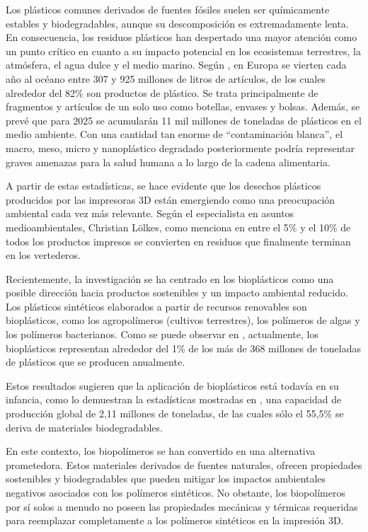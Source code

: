 \documentclass[14pt,oneside]{extarticle} %
\begin{document}
Los plásticos comunes derivados de fuentes fósiles suelen ser químicamente estables y biodegradables, aunque su descomposición es extremadamente lenta. En consecuencia, los residuos plásticos han despertado una mayor atención como un punto crítico en cuanto a su impacto potencial en los ecosistemas terrestres, la atmósfera, el agua dulce y el medio marino. Según \cite{dang2022}, en Europa se vierten cada año al océano entre 307 y 925 millones de litros de artículos, de los cuales alrededor del 82\% son productos de plástico. Se trata principalmente de fragmentos y artículos de un solo uso como botellas, envases y bolsas. Además, se prevé que para 2025 se acumularán 11 mil millones de toneladas de plásticos en el medio ambiente. Con una cantidad tan enorme de “contaminación blanca”, el macro, meso, micro y nanoplástico degradado posteriormente podría representar graves amenazas para la salud humana a lo largo de la cadena alimentaria.

A partir de estas estadísticas, se hace evidente que los desechos plásticos producidos por las impresoras 3D están emergiendo como una preocupación ambiental cada vez más relevante. Según el especialista en asuntos medioambientales, Christian Lölkes, como menciona en \cite{nationalgeographic} entre el 5\% y el 10\% de todos los productos impresos se convierten en residuos que finalmente terminan en los vertederos.

Recientemente, la investigación se ha centrado en los bioplásticos como una posible dirección hacia productos sostenibles y un impacto ambiental reducido. Los plásticos sintéticos elaborados a partir de recursos renovables son bioplásticos, como los agropolímeros (cultivos terrestres), los polímeros de algas y los polímeros bacterianos. Como se puede observar en \cite{rajpoot2022}, actualmente, los bioplásticos representan alrededor del 1\% de los más de 368 millones de toneladas de plásticos que se producen anualmente. 

Estos resultados sugieren que la aplicación de bioplásticos está todavía en su infancia, como lo demuestran la estadísticas mostradas en \cite{dang2022}, una capacidad de producción global de 2,11 millones de toneladas, de las cuales sólo el 55,5\% se deriva de materiales biodegradables.

En este contexto, los biopolímeros se han convertido en una alternativa prometedora. Estos materiales derivados de fuentes naturales, ofrecen propiedades sostenibles y biodegradables que pueden mitigar los impactos ambientales negativos asociados con los polímeros sintéticos. No obstante, los biopolímeros por sí solos a menudo no poseen las propiedades mecánicas y térmicas requeridas para reemplazar completamente a los polímeros sintéticos en la impresión 3D.
\end{document}
